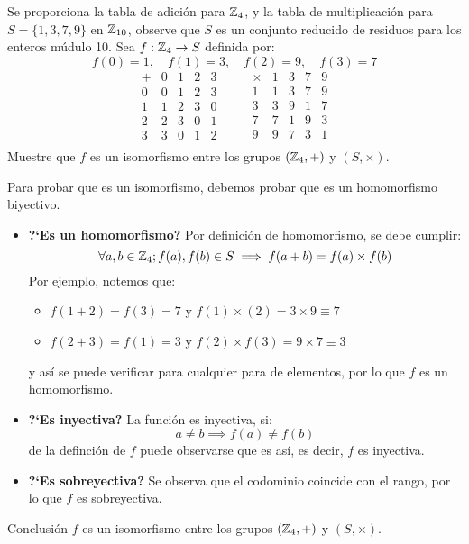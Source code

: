 \begin{fmd-example}
	Se proporciona la tabla de adición para $\mathbb{Z}_4$, y la tabla de multiplicación para $S=\{ 1, 3, 7, 9 \}$ en $\mathbb{Z}_{10}$, observe que $S$ es un conjunto reducido de residuos para los enteros múdulo 10. Sea $f: \mathbb{Z}_4 \rightarrow S$ definida por:
	\[ f(0) = 1, \quad f(1) = 3, \quad f(2) = 9, \quad f(3) = 7 \]
		\[ \begin{array}{c|cccc}
			+ & 0 & 1 & 2 & 3 \\ \hline
			0 & 0 & 1 & 2 & 3\\
			1 & 1 & 2 & 3 & 0\\
			2 & 2 & 3 & 0 & 1\\
			3 & 3 & 0 & 1 & 2\\
		\end{array} \qquad 	\begin{array}{c|cccc}
		\times & 1 & 3 & 7 & 9 \\ \hline
		1 & 1 & 3 & 7 & 9\\
		3 & 3 & 9 & 1 & 7\\
		7 & 7 & 1 & 9 & 3\\
		9 & 9 & 7 & 3 & 1\\
		\end{array} \]
	Muestre que $f$ es un isomorfismo entre los grupos $(\mathbb{Z}_4, +)$ y $(S, \times)$.
	
	Para probar que es un isomorfismo, debemos probar que es un homomorfismo biyectivo.
	
	\begin{itemize}
		\item \textbf{?`Es un homomorfismo?}
		Por definición de homomorfismo, se debe cumplir:
		\[ \forall a, b \in \mathbb{Z}_4; f(a), f(b) \in S \implies f(a + b) = f(a) \times f(b) \]
		Por ejemplo, notemos que:
		\begin{itemize}
			\item $ f(1 + 2) = f(3) = 7 $ y $f(1) \times (2) = 3 \times 9 \equiv 7$
			\item $f(2 + 3) = f(1) = 3$ y $f(2) \times f(3) = 9 \times 7 \equiv 3$
		\end{itemize}
		y así se puede verificar para cualquier para de elementos, por lo que $f$ es un homomorfismo.
		
		\item \textbf{?`Es inyectiva?}
		La función es inyectiva, si:
		\[ a \ne b \implies f(a) \ne f(b) \]
		de la definción de $f$ puede observarse que es así, es decir, $f$ es inyectiva.
		
		\item \textbf{?`Es sobreyectiva?}
		Se observa que el codominio coincide con el rango, por lo que $f$ es sobreyectiva.		
	\end{itemize}
	Conclusión $f$ es un isomorfismo entre los grupos $(\mathbb{Z}_4, +)$ y $(S, \times)$.
\end{fmd-example}

